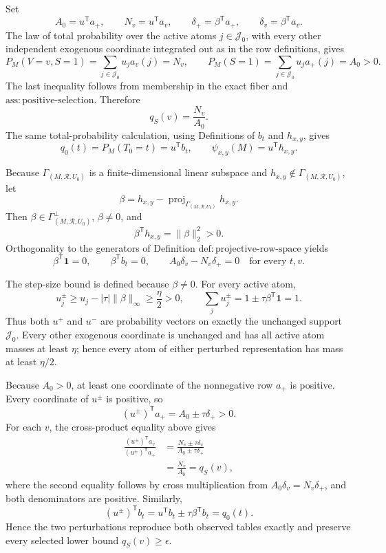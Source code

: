 Set
\[
 A_0=u^{\mathsf T}a_+,
 \qquad N_v=u^{\mathsf T}a_v,
 \qquad \delta_+=\beta^{\mathsf T}a_+,
 \qquad \delta_v=\beta^{\mathsf T}a_v.
\]
The law of total probability over the active atoms \(j\in\mathcal J_0\), with every other independent exogenous coordinate integrated out as in the row definitions, gives
\[
 P_M(V=v,S=1)=\sum_{j\in\mathcal J_0}u_ja_v(j)=N_v,
 \qquad
 P_M(S=1)=\sum_{j\in\mathcal J_0}u_ja_+(j)=A_0>0.
\]
The last inequality follows from membership in the exact fiber and \(\mathrm{ass{:}positive\text{-}selection}\).  Therefore
\[
 q_S(v)=\frac{N_v}{A_0}.
\]
The same total-probability calculation, using Definitions of \(b_t\) and \(h_{x,y}\), gives
\[
 q_0(t)=P_M(T_0=t)=u^{\mathsf T}b_t,
 \qquad
 \psi_{x,y}(M)=u^{\mathsf T}h_{x,y}.
\]

Because \(\Gamma_{(M,\mathcal R,U_0)}\) is a finite-dimensional linear subspace and \(h_{x,y}\notin\Gamma_{(M,\mathcal R,U_0)}\), let
\[
 \beta=h_{x,y}-\operatorname{proj}_{\Gamma_{(M,\mathcal R,U_0)}}h_{x,y}.
\]
Then \(\beta\in\Gamma_{(M,\mathcal R,U_0)}^{\perp}\), \(\beta\neq0\), and
\[
 \beta^{\mathsf T}h_{x,y}=\lVert\beta\rVert_2^2>0.
\]
Orthogonality to the generators of Definition \(\mathrm{def{:}projective\text{-}row\text{-}space}\) yields
\[
 \beta^{\mathsf T}\mathbf 1=0,
 \qquad
 \beta^{\mathsf T}b_t=0,
 \qquad
 A_0\delta_v-N_v\delta_+=0
 \quad\text{for every }t,v.
\]

The step-size bound is defined because \(\beta\neq0\).  For every active atom,
\[
 u_j^{\pm}
 \geq u_j-\lvert\tau\rvert\lVert\beta\rVert_\infty
 \geq\frac{\eta}{2}>0,
 \qquad
 \sum_j u_j^{\pm}=1\pm\tau\beta^{\mathsf T}\mathbf 1=1.
\]
Thus both \(u^+\) and \(u^-\) are probability vectors on exactly the unchanged support \(\mathcal J_0\).  Every other exogenous coordinate is unchanged and has all active atom masses at least \(\eta\); hence every atom of either perturbed representation has mass at least \(\eta/2\).

Because \(A_0>0\), at least one coordinate of the nonnegative row \(a_+\) is positive.  Every coordinate of \(u^\pm\) is positive, so
\[
 (u^\pm)^{\mathsf T}a_+=A_0\pm\tau\delta_+>0.
\]
For each \(v\), the cross-product equality above gives
\[
 \begin{aligned}
 \frac{(u^\pm)^{\mathsf T}a_v}{(u^\pm)^{\mathsf T}a_+}
 &=\frac{N_v\pm\tau\delta_v}{A_0\pm\tau\delta_+}\\
 &=\frac{N_v}{A_0}=q_S(v),
 \end{aligned}
\]
where the second equality follows by cross multiplication from \(A_0\delta_v=N_v\delta_+\), and both denominators are positive.  Similarly,
\[
 (u^\pm)^{\mathsf T}b_t=u^{\mathsf T}b_t\pm\tau\beta^{\mathsf T}b_t=q_0(t).
\]
Hence the two perturbations reproduce both observed tables exactly and preserve every selected lower bound \(q_S(v)\geq\epsilon\).

